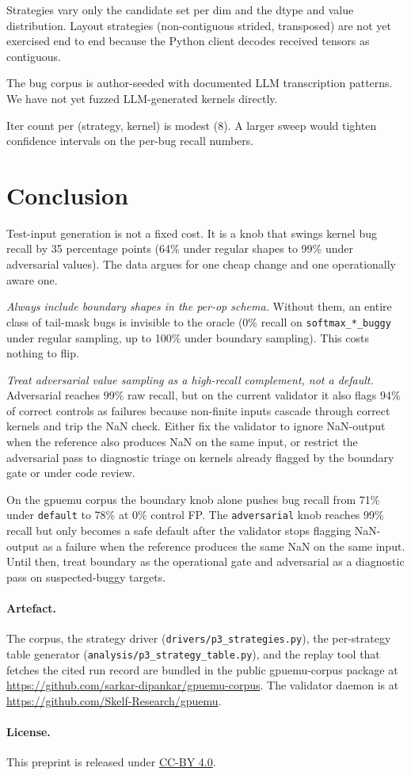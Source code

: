 \documentclass[runningheads]{llncs}
\begin{document}
Strategies vary only the candidate set per dim and the dtype and
value distribution. Layout strategies (non-contiguous strided,
transposed) are not yet exercised end to end because the Python
client decodes received tensors as contiguous.

The bug corpus is author-seeded with documented LLM transcription
patterns. We have not yet fuzzed LLM-generated kernels directly.

Iter count per (strategy, kernel) is modest (8). A larger sweep would
tighten confidence intervals on the per-bug recall numbers.

\section{Conclusion}
\label{sec:conclusion}

Test-input generation is not a fixed cost. It is a knob that swings
kernel bug recall by 35 percentage points (64\% under regular shapes
to 99\% under adversarial values). The data argues for one cheap
change and one operationally aware one.

\emph{Always include boundary shapes in the per-op schema.} Without
them, an entire class of tail-mask bugs is invisible to the oracle
(0\% recall on \texttt{softmax\_*\_buggy} under regular sampling, up
to 100\% under boundary sampling). This costs nothing to flip.

\emph{Treat adversarial value sampling as a high-recall complement,
not a default.} Adversarial reaches 99\% raw recall, but on the
current validator it also flags 94\% of correct controls as failures
because non-finite inputs cascade through correct kernels and trip
the NaN check. Either fix the validator to ignore NaN-output when
the reference also produces NaN on the same input, or restrict the
adversarial pass to diagnostic triage on kernels already flagged by
the boundary gate or under code review.

On the gpuemu corpus the boundary knob alone pushes bug recall from
71\% under \texttt{default} to 78\% at 0\% control FP. The
\texttt{adversarial} knob reaches 99\% recall but only becomes a safe
default after the validator stops flagging NaN-output as a failure
when the reference produces the same NaN on the same input. Until
then, treat boundary as the operational gate and adversarial as a
diagnostic pass on suspected-buggy targets.

\paragraph{Artefact.}
The corpus, the strategy driver
(\texttt{drivers/p3\_strategies.py}), the per-strategy table
generator (\texttt{analysis/p3\_strategy\_table.py}), and the replay
tool that fetches the cited run record are bundled in the public
\textsf{gpuemu-corpus} package at
\url{https://github.com/sarkar-dipankar/gpuemu-corpus}. The
validator daemon is at
\url{https://github.com/Skelf-Research/gpuemu}.

\paragraph{License.}
This preprint is released under
\href{https://creativecommons.org/licenses/by/4.0/}{CC-BY 4.0}.



\end{document}
